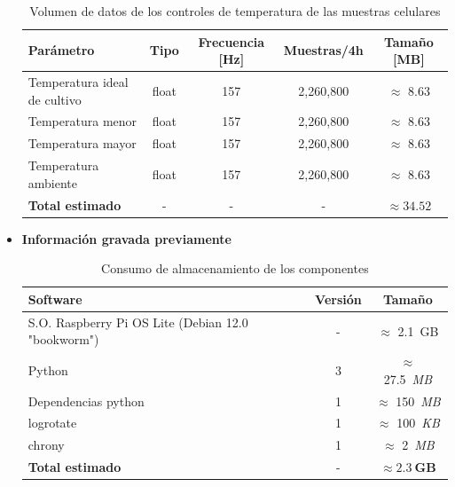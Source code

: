 \begin{itemize}
        \begin{table}[H]
        \centering
        \begin{tabular}{|l|c|c|c|c|}
        \hline
        \textbf{Parámetro} & \textbf{Tipo} & \textbf{Frecuencia [Hz]} & \textbf{Muestras/4h} & \textbf{Tamaño [MB]} \\
        \hline
        Temperatura ideal de cultivo & float & 157 & 2,260,800 & $\approx$ 8.63 \\
        Temperatura menor            & float & 157 & 2,260,800 & $\approx$ 8.63 \\
        Temperatura mayor            & float & 157 & 2,260,800 & $\approx$ 8.63 \\
        Temperatura ambiente         & float & 157 & 2,260,800 & $\approx$ 8.63 \\
        \hline
        \textbf{Total estimado}      & -     & -   & -         & $\boldsymbol{\approx 34.52}$ \\
        \hline
        \end{tabular}
        \caption{Volumen de datos de los controles de temperatura de las muestras celulares}
        \label{tab:volumen_datos_temperatura}
        \end{table}

        \item \textbf{Información gravada previamente}

        \begin{table}[H]
        \centering
        \begin{tabular}{|l|c|c|}
        \hline
        \textbf{Software} & \textbf{Versión} & \textbf{Tamaño} \\
        \hline
        S.O. Raspberry Pi OS Lite (Debian 12.0 "bookworm") & - & $\approx$ 2.1~GB \\
        Python                   & 3 & $\approx$ 27.5~\textit{MB} \\
        Dependencias python      & 1 & $\approx$ 150~\textit{MB} \\
        logrotate                & 1 & $\approx$ 100~\textit{KB} \\
        chrony                   & 1 & $\approx$ 2~\textit{MB} \\
        \hline
        \textbf{Total estimado}  & - & $\boldsymbol{\approx 2.3~GB}$ \\
        \hline
        \end{tabular}
        \caption{Consumo de almacenamiento de los componentes}
        \label{tab:almacenamiento_componentes}
        \end{table}
    
      \end{itemize}

